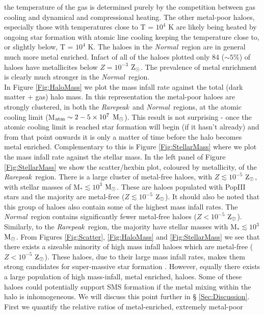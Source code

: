 \documentclass[graphics, twocolumn, usenatbib]{mn2e}
\newcommand{\msolarc} {$\rm{M_{\odot}}$}
\newcommand{\zsolarc} {$\rm{Z_{\odot}}$}
\newcommand{\rarepeak} {\textit{Rarepeak~}}
\newcommand{\normal} {\textit{Normal~}}
\begin{document}
the temperature of the gas is determined purely by the competition between gas cooling and
dynamical and compressional heating. The other metal-poor haloes, especially those with temperatures
close to T = $10^4$ K are likely being heated by ongoing star formation with atomic line
cooling keeping the temperature close to, or slightly below, T = $10^4$ K. 
The haloes in the \normal region are in general much more metal enriched. Infact of
all of the haloes plotted only 84 ($\sim 5$\%) of  haloes have metallicites
below  $Z = 10^{-3}$ \zsolarc. The prevalence of metal enrichment is clearly much stronger in
the \normal region.\\
\indent In Figure \ref{Fig:HaloMass} we plot the mass infall rate against the total (dark matter
+ gas) halo mass. In this representation the metal-poor haloes are strongly clustered, in both
the \rarepeak and \normal regions, at the atomic cooling limit (M$_{\rm atm} \sim 2 - 5 \times 10^7$
\msolarc). This result is not surprising - once the atomic cooling limit is reached star formation
will begin (if it hasn't already) and from that point onwards it is only a matter of time before
the halo becomes metal enriched. Complementary to this is Figure \ref{Fig:StellarMass}
where we plot the mass infall rate against the stellar mass. In the left panel of Figure
\ref{Fig:StellarMass} we show the scatter/hexbin plot, coloured by metallicity, of the
\rarepeak region. There is a large cluster of metal-free haloes, with $Z \lesssim 10^{-5}$ \zsolarc,
with stellar masses of M$_{*} \lesssim 10^3$ \msolarc. These are haloes
populated with PopIII stars and the majority are metal-free ($Z \lesssim 10^{-5}$ \zsolarc).
It should also be noted that this group of haloes also contain some of the highest mass infall
rates. The \normal region contains significantly fewer metal-free haloes ($Z < 10^{-5}$ \zsolarc).
Similarly, to the \rarepeak region, the majority have stellar masses
with M$_{*} \lesssim 10^3$ \msolarc.  From Figures \ref{Fig:Scatter}, \ref{Fig:HaloMass}
and \ref{Fig:StellarMass} we see that there exists a sizeable minority of high mass infall haloes
which are metal-free ($Z < 10^{-5}$ \zsolarc). These
haloes, due to their large mass infall rates, makes them strong candidates for super-massive
star formation \citep{Woods_2018, Chon_2020}. However, equally there exists a large population of
high mass-infall, metal enriched, haloes. Some of these haloes could potentially support SMS formation
if the metal mixing within the halo is inhomogeneous. We will discuss this point further in \S
\ref{Sec:Discussion}. First we quantify the relative ratios of metal-enriched, extremely metal-poor
\end{document}
